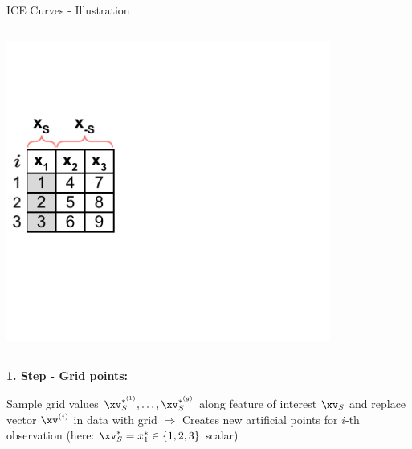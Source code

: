 \documentclass[11pt,compress,t,notes=noshow, aspectratio=169, xcolor=table]{beamer}
\begin{document}
\begin{frame}{ICE Curves - Illustration}

\begin{columns}[c]
\begin{column}{0.4\textwidth}
\includegraphics[page=2, trim=0cm 0.35cm 0.85cm 0.35cm, width=0.9\textwidth]{../../figure_man/ice_plot_demo}
\end{column}
\begin{column}{0.55\textwidth}

\end{column}
\end{columns}
\vspace*{\topsep}

\textbf{1. Step - Grid points:}

Sample grid values $\xv_S^{*^{(1)}}, \dots, \xv_S^{*^{(g)}}$ along feature of interest $\xv_S$
%
and replace vector $\xv^{(i)}$ in data with grid
\newline $\Rightarrow$ Creates new artificial points for $i$-th observation (here: $\xv_S^* = x_1^* \in \{1, 2, 3\}$ scalar)

\end{frame}
\end{document}
